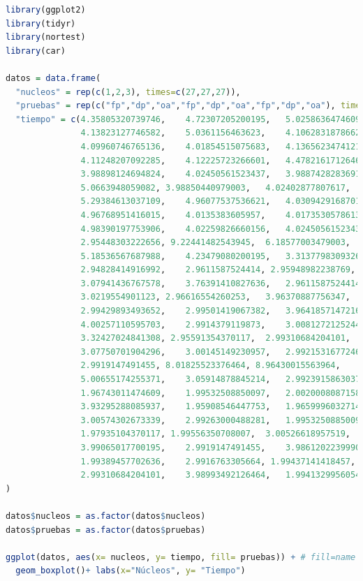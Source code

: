 \documentclass{article}
\begin{document}
\vspace{5mm}
\begin{lstlisting}[language=R]
library(ggplot2)
library(tidyr)
library(nortest)
library(car)

datos = data.frame(
  "nucleos" = rep(c(1,2,3), times=c(27,27,27)),
  "pruebas" = rep(c("fp","dp","oa","fp","dp","oa","fp","dp","oa"), times=c(9,9,9,9,9,9,9,9,9)),
  "tiempo" = c(4.35805320739746,	4.72307205200195,	5.02586364746093,
               4.13823127746582,	5.0361156463623,	4.10628318786621,
               4.09960746765136,	4.01854515075683,	4.1365623474121, 
               4.11248207092285,	4.12225723266601,	4.47821617126464,	
               3.98898124694824,	4.02450561523437,	3.98874282836914,	
               5.0663948059082,	3.98850440979003,	4.02402877807617,	
               5.29384613037109,	4.96077537536621,	4.03094291687011, 
               4.96768951416015,	4.0135383605957,	4.01735305786132,	
               4.98390197753906,	4.02259826660156,	4.02450561523437,	
               2.95448303222656, 9.22441482543945,	6.18577003479003,	
               5.18536567687988,	4.23479080200195,	3.31377983093261,	
               2.94828414916992,	2.9611587524414, 2.95948982238769,	
               3.07941436767578,	3.76391410827636,	2.9611587524414,	
               3.0219554901123,	2.96616554260253,	3.96370887756347, 
               2.99429893493652,	2.99501419067382,	3.96418571472167,	
               4.00257110595703,	2.9914379119873,	3.00812721252441,	
               3.32427024841308, 2.95591354370117,	2.99310684204101,	
               3.07750701904296,	3.00145149230957,	2.9921531677246,	
               2.9919147491455,	8.01825523376464, 8.96430015563964,	
               5.00655174255371,	3.05914878845214,	2.99239158630371,	
               1.96743011474609,	1.99532508850097,	2.00200080871582, 
               3.93295288085937,	1.95908546447753,	1.96599960327148,	
               3.00574302673339,	2.99263000488281,	1.99532508850097,	
               1.97935104370117, 1.99556350708007,	3.00526618957519,	
               3.99065017700195,	2.9919147491455,	3.98612022399902,	
               1.99389457702636,	2.9916763305664, 1.99437141418457,	
               2.99310684204101,	3.98993492126464,	1.99413299560546)
)

datos$nucleos = as.factor(datos$nucleos)
datos$pruebas = as.factor(datos$pruebas)

ggplot(datos, aes(x= nucleos, y= tiempo, fill= pruebas)) + # fill=name allow to automatically dedicate a color for each group
  geom_boxplot()+ labs(x="Núcleos", y= "Tiempo")


\end{lstlisting}
\end{document}

